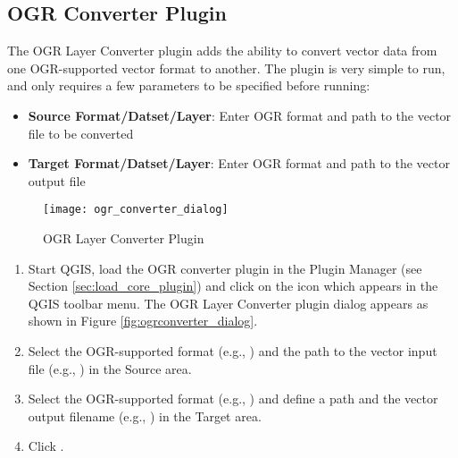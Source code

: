
\subsection{OGR Converter Plugin}


The OGR Layer Converter plugin adds the ability to convert vector data from one OGR-supported 
vector format to another.
The plugin is very simple to run, and only requires a few parameters to be 
specified before running:

\begin{itemize}
\item \textbf{Source Format/Datset/Layer}: Enter OGR format and path to the vector file to be converted
\item \textbf{Target Format/Datset/Layer}: Enter OGR format and path to the vector output file
\end{itemize}

\begin{figure}[ht]
   \begin{center}
   \caption{OGR Layer Converter Plugin \nixcaption}\label{fig:ogr_converter_dialog}\smallskip
   \texttt{[image: ogr\_converter\_dialog]}
\end{center}  
\end{figure}


\begin{enumerate}
  \item Start QGIS, load the OGR converter plugin in the Plugin Manager (see Section 
  \ref{sec:load_core_plugin}) and click on the  
  icon which appears in the QGIS toolbar menu. The OGR Layer Converter plugin dialog appears as shown in Figure \ref{fig:ogrconverter_dialog}.
  \item Select the OGR-supported format (e.g., ) and the path to the vector input file (e.g., ) in the Source area.
  \item Select the OGR-supported format (e.g., ) and define a path and the vector output filename (e.g., ) in the Target area.
  \item Click .
\end{enumerate}

\newpage
